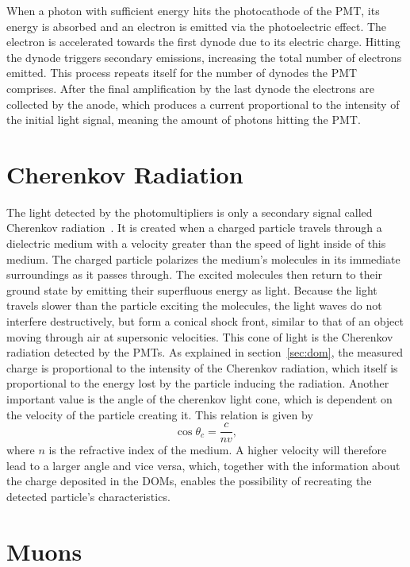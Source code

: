 When a photon with sufficient energy hits the photocathode of the PMT, its energy is absorbed and an electron is emitted via the photoelectric effect.
The electron is accelerated towards the first dynode due to its electric charge. Hitting the dynode triggers secondary emissions, increasing the total 
number of electrons emitted. This process repeats itself for the number of dynodes the PMT comprises. After the final amplification by the last 
dynode the electrons are collected by the anode, which produces a current proportional to the intensity of the initial light signal, meaning the amount of
photons hitting the PMT\@. 

\section{Cherenkov Radiation}

The light detected by the photomultipliers is only a secondary signal called Cherenkov radiation~\cite{PhysRevX.13.011002}. It is created when a charged particle travels through a 
dielectric medium with a velocity greater than the speed of light inside of this medium. The charged particle polarizes the medium's molecules in its
immediate surroundings as it passes through. The excited molecules then return to their ground state by emitting their superfluous energy as light.
Because the light travels slower than the particle exciting the molecules, the light waves do not interfere destructively, but form a conical shock front, similar to that of an object moving through air at supersonic velocities. This cone of light is the Cherenkov radiation detected by the PMTs.
As explained in section~\ref{sec:dom}, the measured charge is proportional to the intensity of the Cherenkov radiation, which itself is proportional to the 
energy lost by the particle inducing the radiation. Another important value is the angle of the cherenkov light cone, which is dependent on the velocity of the 
particle creating it. This relation is given by 
\begin{equation}
    \cos{\theta_c} = \frac{c}{nv},
\end{equation}
where $n$ is the refractive index of the medium. A higher velocity will therefore lead to a larger angle and vice versa, which, together with the information about 
the charge deposited in the DOMs, enables the possibility of recreating the detected particle's characteristics.

\section{Muons}\label{sec:muons}

